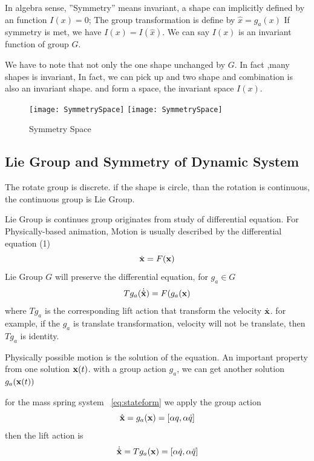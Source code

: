 In algebra sense, ''Symmetry'' means invariant, a shape can implicitly defined by an function $I(x)=0$;
The group transformation is define by $\hat{x}=g_a(x)$
If symmetry is met, we have $I(x)=I(\hat{x})$.
We can say $I(x)$ is an invariant function of group $G$.

We have to note that not only the one shape unchanged by $G$.
In fact ,many shapes is invariant, 
In fact, we can pick up and two shape and combination is also an invariant shape. 
and form a space, the invariant space $I(x)$.


\begin{figure}[!htbp]
  \begin{center}
    \leavevmode
    \ifpdf
      \texttt{[image: SymmetrySpace]}
    \else
      \texttt{[image: SymmetrySpace]}
    \fi
    \caption{Symmetry Space}
    \label{fig:symmetry Space}
\end{center}
\end{figure}





\subsection{Lie Group and Symmetry of Dynamic System}
The rotate group is discrete.
if the shape is circle, than the rotation is continuous, the continuous group is Lie Group.

Lie Group is continues group originates from study of differential equation.
For Physically-based animation,
Motion is usually described by the differential equation (1)
\begin{equation}
	\dot{\mathbf{x}}=F(\mathbf{x})
\end{equation}
Lie Group $G$ will preserve the differential equation, for $g_a \in G$ 
\[
Tg_a(\dot{\hat{\mathbf{x}}})=F(g_a(\mathbf{x})
\]
where $Tg_a$ is the corresponding lift action that transform the velocity $\dot{\mathbf{x}}$.
for example, if the $g_a$ is translate transformation, velocity will not be translate, then $Tg_a$ is identity.





Physically possible motion is the solution of the equation.
An important property from one solution $\mathbf{x}(t)$.
with a group action $g_a$, we can get another solution $g_a(\mathbf{x}(t))$
 	
for the mass spring system ~\ref{eq:stateform}
we apply the group action 
\[
\hat{\mathbf{x}}=g_a(\mathbf{x})=[\alpha q, \alpha \dot{q} ]
\]
then the lift action is
\[
\dot{\hat{\mathbf{x}}}=Tg_a(\mathbf{x})=[\alpha \dot{q}, \alpha \ddot{q}]
\]



